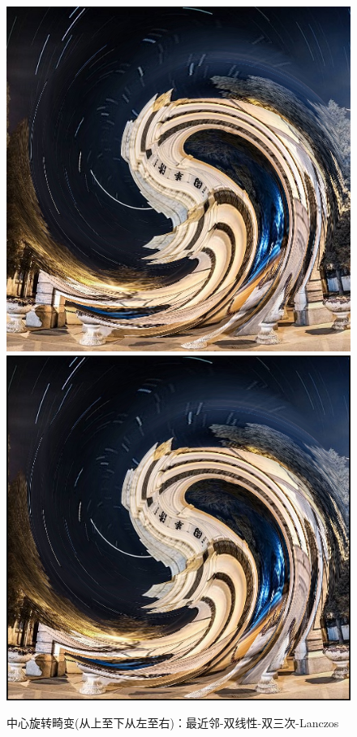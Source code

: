\documentclass[UTF8]{ctexart}
\begin{document}
\begin{figure}[H]
    \includegraphics[scale=0.3]{../images/report-images/tangent_distortionbicub.png}
    \includegraphics[scale=0.3]{../images/report-images/tangent_distortionLanczos.png}
    \caption{中心旋转畸变(从上至下从左至右)：最近邻-双线性-双三次-Lanczos}
\end{figure}
\end{document}
